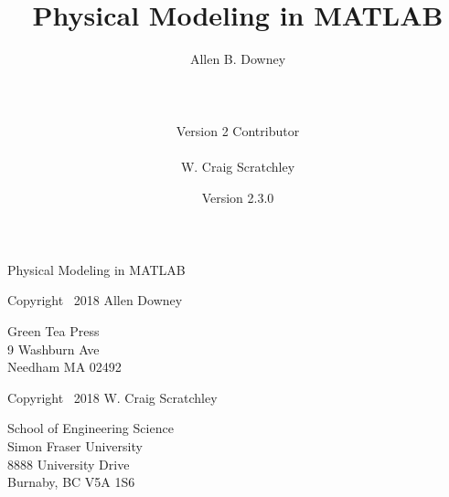 \documentclass[
]{book}
\numberwithin{Answer}{chapter}
\numberwithin{Exercise}{chapter}
\newcommand{\myreg}{\textsuperscript{{\tiny \textregistered}}}
\newcommand{\thetitle}{Physical Modeling in MATLAB\myreg}
\newcommand{\theversion}{2.3.0}
\begin{document}
\frontmatter

\title {\thetitle}
\author {Allen B. Downey\\
\\
\\
\\
Version 2 Contributor\\
\\
W. Craig Scratchley\\}
\date {Version \theversion}




    \maketitle
\restoregeometry


\vspace{2in}

\begin{center}
    {\Large \thetitle}
\end{center}

\vspace{21em}

Copyright \textcopyright \, 2018 Allen Downey

\vspace{0.5em}

\begin{flushleft}
Green Tea Press       \\
9 Washburn Ave \\
Needham MA 02492
\end{flushleft}

\vspace{0.5em}

Copyright \textcopyright \, 2018 W. Craig Scratchley

\vspace{0.5em}

\begin{flushleft}
School of Engineering Science\\
Simon Fraser University\\
8888 University Drive\\
Burnaby, BC V5A 1S6
\end{flushleft}
\end{document}
